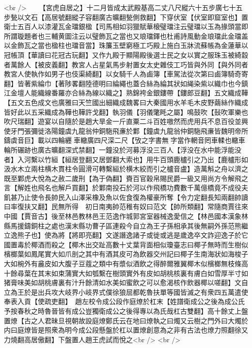 <br />
　　【宮虎自居之】十二月皆成太武殿基高二丈八尺縱六十五步廣七十五步甃以文石【高居號翻縱子容翻廣古曠翻甃側救翻】下穿伏室【伏室即窟室也】置衛士五百人以漆灌瓦金璫銀楹【司馬相如羽獵賦華榱璧璫注云璧璫以玉為掾頭當即所謂璇題者也三輔黄圖注云以璧飾瓦之當也又琅璫鐸也杜甫詩風動金琅璫此金璫盖以金飾瓦之當也楹柱也璫音當】珠簾玉壁窮極工巧殿上施白玉牀流蘇帳為金蓮華以冠帳頂【華讀曰花冠古玩翻】又作九殿于顯陽殿後選士民之女以實之服珠玉被綺縠者萬餘人【被皮義翻】教宮人占星氣馬步射置女太史雜伎工巧皆與外同【與外同者教宮人使執作如男子也伎渠綺翻】以女騎千人為鹵簿【車駕法從次第曰鹵簿騎奇寄翻】皆著紫綸巾【著陟畧翻陸德明曰綸繩也蓋合絲為綸其狀如䋲染紫以織巾也今鎮江金壇人能織線番羅亦合絲為線以織之】熟錦袴金銀鏤帶【鏤郎豆翻】五文織成鞾【五文五色成文也廣雅曰天竺國出細織成魏畧曰大秦國用水羊毛木皮野繭絲作織成皆好此以五采織成為鞾也鞾許戈翻】執羽儀【羽儀氅眊之屬】鳴鼓吹【鼔吹軍樂也吹尺瑞翻】遊宴以自隨於是趙大旱金一斤直粟二斗百姓嗷然而虎用兵不息百役並興使牙門張彌徙洛陽鐘虡九龍翁仲銅駞飛亷於鄴【鐘虡九龍翁仲銅駞飛亷皆魏明帝所鑄虡音巨】載以四輪纒車轍廣四尺深二尺【攷之字書無字當作輞音罔車輮也轍車輪所碾跡也廣古曠翻深式禁翻】一鐘没於河募浮没三百人【浮没在水中能浮能没者】入河繫以竹絙【絙居登翻又居鄧翻大索也】用牛百頭鹿櫨引之乃出【鹿櫨形如汲水木立兩柱横木貫柱令圓滑可轉繫絙於横木絞而引之櫨音盧】造萬斛之舟以濟之既至鄴虎大悅為之赦二歲刑【為于偽翻】賚百官穀帛賜民爵一級又用尚方令解飛之言【解姓也飛名也解戶買翻】於鄴南投石於河以作飛橋功費數千萬億橋竟不成役夫飢甚乃止使令長帥民入山澤采橡及魚以佐食復為權豪所奪【令力定翻長知兩翻帥讀曰率復扶又翻】民無所得　初日南夷帥范稚有奴曰范文【帥所類翻】常隨商賈往來中國【賈音古】後至林邑教林邑王范逸作城郭宮室器械逸愛信之【林邑國本漢象林縣馬援鑄銅柱之處也漢末縣功曹子區連殺今自立為王子孫相承其後無嗣外孫范熊繼立逸熊子也】使為將【將即亮翻】文遂譖逸諸子或徙或逃是歲逸卒文詐迎逸子於它國置毒於椰酒而殺之【椰木出交趾高數十丈葉背面相似瓊臺志曰椰子無時而生樹似檳榔葉如鳳尾實大如爪剖之其中有酒其皮可為飲器交州記曰椰子生南海狀如海梭子大如椀外有麄皮如大腹子豆蔻之類中有漿似酒飲之得醉爾雅翼椰木似檳榔無枝條高十餘尋葉在其末如束蒲實大如瓠繫在樹頭實外有皮如胡桃核裏有膚白如雪厚半寸如猪膏味美如胡桃膚裏有汁升餘清如水美如蜜飲之可以愈渴核作飲器椰以嗟翻】文自立為王於是出兵攻大岐界小岐界式僕徐狼屈都乾魯扶單等國皆滅之有衆四五萬遣使奉表入貢【使疏吏翻】　趙左校令成公段作庭燎於杠末【姓譜衛成公之後為成公氏予按春秋之時魯晉皆有成公豈獨衛成公之後得專以為氏哉杠古雙翻】高十餘丈上盤置燎【古之人君昧旦視朝故設庭燎鄭氏云在地曰燎執之曰燭又云樹之門外曰大燭於内曰庭燎皆是照衆為明今成公段懸盤於杠以置燎創意為之非有古法也燎力照翻徐又力燒翻高居傲翻】下盤置人趙王虎試而悅之<br />
<br />
